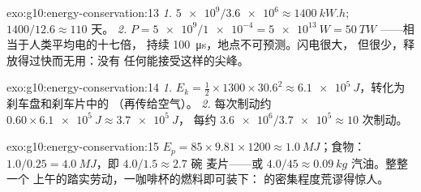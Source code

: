 \begin{solution}{exo:g10:energy-conservation:13}
\emph{1.} $\num{5e9}/\num{3.6e6} \approx \qty{1400}{kW.h}$;
$1400/12.6 \approx 110$ 天。
\emph{2.} $P = \num{5e9}/\num{1e-4} = \qty{5e13}{W} = \qty{50}{TW}$
——相当于人类平均电的十七倍，
持续 \qty{100}{\micro s}，地点不可预测。闪电很大，
但很少，释放得过快而无用：没有
任何能接受这样的尖峰。
\end{solution}

\begin{solution}{exo:g10:energy-conservation:14}
\emph{1.} $E_k = \tfrac12 \times 1300 \times 30.6^2 \approx
\qty{6.1e5}{J}$，转化为刹车盘和刹车片中的
（再传给空气）。
\emph{2.} 每次制动约 $0.60 \times \qty{6.1e5}{J} \approx \qty{3.7e5}{J}$，
每约 $\num{3.6e6}/\num{3.7e5} \approx 10$ 次制动。
\end{solution}

\begin{solution}{exo:g10:energy-conservation:15}
$E_p = 85 \times 9.81 \times 1200 \approx \qty{1.0}{MJ}$；食物：
$1.0/0.25 = \qty{4.0}{MJ}$，即 $4.0/1.5 \approx 2.7$ 碗
麦片——或 $4.0/45 \approx \qty{0.09}{kg}$ 汽油。整整一个
上午的踏实劳动，一咖啡杯的燃料即可装下：
的密集程度荒谬得惊人。
\end{solution}


